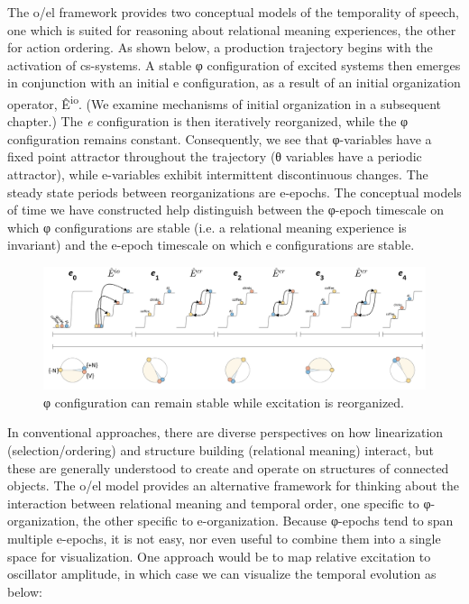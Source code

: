 The o/el framework provides two conceptual models of the temporality of speech, one which is suited for reasoning about relational meaning experiences, the other for action ordering. As shown below, a production trajectory begins with the activation of cs-systems. A stable φ configuration of excited systems then emerges in conjunction with an initial e configuration, as a result of an initial organization operator, Ê\textsuperscript{io}. (We examine mechanisms of initial organization in a subsequent chapter.) The \textit{e} configuration is then iteratively reorganized, while the φ configuration remains constant. Consequently, we see that φ-variables have a fixed point attractor throughout the trajectory (θ variables have a periodic attractor), while e-variables exhibit intermittent discontinuous changes. The steady state periods between reorganizations are e-epochs. The conceptual models of time we have constructed help distinguish between the φ-epoch timescale on which φ configurations are stable (i.e. a relational meaning experience is invariant) and the e-epoch timescale on which e configurations are stable.

  
\begin{figure}
\includegraphics[width=\textwidth]{figures/Tilsen-img27.png}
\caption{φ configuration can remain stable while excitation is reorganized.}
\label{fig:2:20}
\end{figure}
 

  In conventional approaches, there are diverse perspectives on how linearization (selection/ordering) and structure building (relational meaning) interact, but these are generally understood to create and operate on structures of connected objects. The o/el model provides an alternative framework for thinking about the interaction between relational meaning and temporal order, one specific to φ-organization, the other specific to e-organization. Because φ-epochs tend to span multiple e-epochs, it is not easy, nor even useful to combine them into a single space for visualization. One approach would be to map relative excitation to oscillator amplitude, in which case we can visualize the temporal evolution as below:

